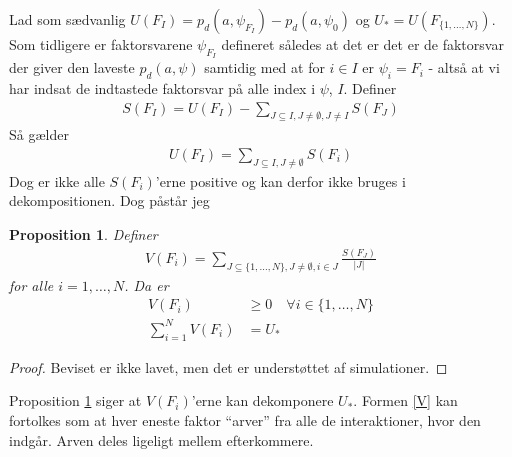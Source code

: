 \documentclass[a4paper, 12pt]{memoir}
\newtheorem{proposition}{Proposition}[section]
\begin{document}
Lad som sædvanlig $U(F_I)=p_d(a,\psi_{F_I})-p_d(a, \psi_{0})$ og $U_*=U(F_{\{1,\dots,N\}})$. Som tidligere er faktorsvarene $\psi_{F_I}$ defineret således at det er det er de faktorsvar der giver den laveste $p_d(a,\psi)$ samtidig med at for $i\in I$ er $\psi_i=F_{i}$ - altså at vi har indsat de indtastede faktorsvar på alle index i $\psi$, $I$. Definer
\begin{align*}
S(F_I)=U(F_I)-\sum_{J\subseteq I, J\neq \emptyset, J\neq I} S(F_J)
\end{align*}
Så gælder
\begin{align*}
U(F_I)=\sum_{J\subseteq I, J\neq \emptyset}S(F_i)
\end{align*}
Dog er ikke alle $S(F_i)$'erne positive og kan derfor ikke bruges i dekompositionen. Dog påstår jeg

\begin{proposition}\label{divided}
Definer
\begin{align}
V(F_i)=\sum_{J\subseteq\{1,\dots, N\}, J\neq \emptyset, i\in J} \frac{S(F_J)}{|J|}\label{V}
\end{align}
for alle $i=1, \dots, N$. Da er
\begin{align}
V(F_i)&\geq 0 \quad \forall i\in \{1, \dots, N\}\\
\sum_{i=1}^NV(F_i)&=U_*
\end{align}
\end{proposition}
\begin{proof}
Beviset er ikke lavet, men det er understøttet af simulationer. 
\end{proof}

Proposition \ref{divided} siger at $V(F_i)$'erne kan dekomponere $U_*$. Formen \eqref{V} kan fortolkes som at hver eneste faktor ``arver'' fra alle de interaktioner, hvor den indgår. Arven deles ligeligt mellem efterkommere.
\end{document}
